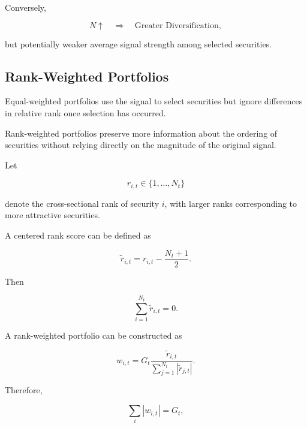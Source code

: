 \documentclass[11pt,a4paper]{article}
\begin{document}
Conversely,

\begin{equation}
N\uparrow
\quad\Rightarrow\quad
\text{Greater Diversification},
\end{equation}

but potentially weaker average signal strength among selected securities.


\subsection{Rank-Weighted Portfolios}
\label{subsec:rank_weighted_portfolios}

Equal-weighted portfolios use the signal to select securities but ignore
differences in relative rank once selection has occurred.

Rank-weighted portfolios preserve more information about the ordering of
securities without relying directly on the magnitude of the original signal.

Let

\begin{equation}
r_{i,t}
\in
\{1,\ldots,N_t\}
\end{equation}

denote the cross-sectional rank of security $i$, with larger ranks corresponding
to more attractive securities.

A centered rank score can be defined as

\begin{equation}
\boxed{
\widetilde{r}_{i,t}
=
r_{i,t}
-
\frac{N_t+1}{2}.
}
\end{equation}

Then

\begin{equation}
\sum_{i=1}^{N_t}
\widetilde{r}_{i,t}
=
0.
\end{equation}

A rank-weighted portfolio can be constructed as

\begin{equation}
\boxed{
w_{i,t}
=
G_t
\frac{
\widetilde{r}_{i,t}
}{
\sum_{j=1}^{N_t}
|\widetilde{r}_{j,t}|
}.
}
\end{equation}

Therefore,

\begin{equation}
\sum_i |w_{i,t}|=G_t,
\end{equation}
\end{document}
